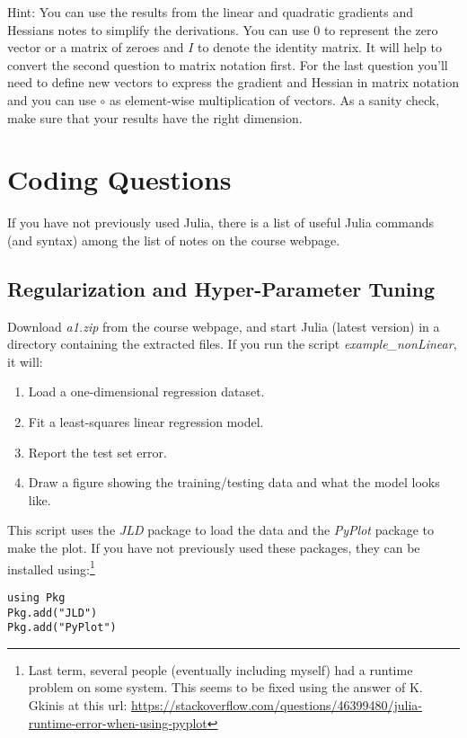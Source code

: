 \documentclass{article}
\def\enum#1{\begin{enumerate}#1\end{enumerate}}
\begin{document}
Hint: You can use the results from the linear and quadratic gradients and Hessians notes to simplify the derivations. You can use $0$ to represent the zero vector or a matrix of zeroes and $I$ to denote the identity matrix. It will help to convert the second question to matrix notation first. For the last question you'll need to define new vectors to express the gradient and Hessian in matrix notation and you can use $\circ$ as element-wise multiplication of vectors. As a sanity check, make sure that your results have the right dimension.






\section{Coding Questions}

If you have not previously used Julia, there is a list of useful Julia commands (and syntax) among the list of notes on the course webpage.

\subsection{Regularization and Hyper-Parameter Tuning}


Download \emph{a1.zip} from the course webpage, and start Julia (latest version) in a directory containing the extracted files. If you run the script \emph{example\_nonLinear}, it will:
\enum{
\item Load a one-dimensional regression dataset.
\item Fit a least-squares linear regression model.
\item Report the test set error.
\item Draw a figure showing the training/testing data and what the model looks like.
}
This script uses the \emph{JLD} package to load the data and the \emph{PyPlot} package to make the plot. If you have not previously used these packages, they can be installed using:\footnote{Last term, several people (eventually including myself) had a runtime problem on some system. This seems to be fixed using the answer of 
K. Gkinis at this url: \url{https://stackoverflow.com/questions/46399480/julia-runtime-error-when-using-pyplot}}
\begin{verbatim}
using Pkg
Pkg.add("JLD")
Pkg.add("PyPlot")
\end{verbatim}
\end{document}
